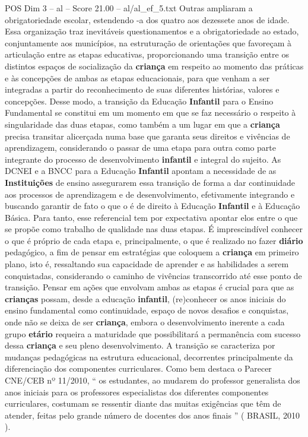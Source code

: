 \begin{textsample}{POS Dim 3 – al – Score 21.00 – al/al\_ef\_5.txt}
Outras ampliaram a obrigatoriedade escolar, estendendo -a dos quatro aos dezessete anos de idade.
Essa organização traz inevitáveis questionamentos e a obrigatoriedade ao estado, conjuntamente aos municípios, na estruturação de orientações que favoreçam à articulação entre as etapas educativas, proporcionando uma transição entre os distintos espaços de socialização da \textbf{criança} em respeito ao momento das práticas e às concepções de ambas as etapas educacionais, para que venham a ser integradas a partir do reconhecimento de suas diferentes histórias, valores e concepções.
Desse modo, a transição da Educação \textbf{Infantil} para o Ensino Fundamental se constitui em um momento em que se faz necessário o respeito à singularidade das duas etapas, como também a um lugar em que a \textbf{criança} precisa transitar alicerçada numa base que garanta seus direitos e vivências de aprendizagem, considerando o passar de uma etapa para outra como parte integrante do processo de desenvolvimento \textbf{infantil} e integral do sujeito.
As DCNEI e a BNCC para a Educação \textbf{Infantil} apontam a necessidade de as \textbf{Instituições} de ensino assegurarem essa transição de forma a dar continuidade aos processos de aprendizagem e de desenvolvimento, efetivamente integrando e buscando garantir de fato o que o é de direito à Educação \textbf{Infantil} e à Educação Básica.
Para tanto, esse referencial tem por expectativa apontar elos entre o que se propõe como trabalho de qualidade nas duas etapas.
É imprescindível conhecer o que é próprio de cada etapa e, principalmente, o que é realizado no fazer \textbf{diário} pedagógico, a fim de pensar em estratégias que coloquem a \textbf{criança} em primeiro plano, isto é, ressaltando sua capacidade de aprender e as habilidades a serem conquistadas, considerando o caminho de vivências transcorrido até esse ponto de transição.
Pensar em ações que envolvam ambas as etapas é crucial para que as \textbf{crianças} possam, desde a educação \textbf{infantil}, (re)conhecer os anos iniciais do ensino fundamental como continuidade, espaço de novos desafios e conquistas, onde não se deixa de ser \textbf{criança}, embora o desenvolvimento inerente a cada grupo \textbf{etário} requeira a maturidade que possibilitará a permanência com sucesso dessa \textbf{criança} e seu pleno desenvolvimento.
A transição se caracteriza por mudanças pedagógicas na estrutura educacional, decorrentes principalmente da diferenciação dos componentes curriculares.
Como bem destaca o Parecer CNE/CEB nº 11/2010, “ os estudantes, ao mudarem do professor generalista dos anos iniciais para os professores especialistas dos diferentes componentes curriculares, costumam se ressentir diante das muitas exigências que têm de atender, feitas pelo grande número de docentes dos anos finais ” ( BRASIL, 2010 ).

\end{textsample}
